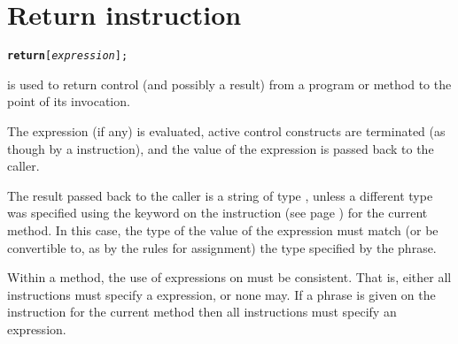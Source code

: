 \section{Return instruction}\label{refreturn}
\begin{shaded}
\begin{alltt}
\textbf{return} [\emph{expression}];
\end{alltt}
\end{shaded}
  is used to return control (and possibly a result)
from a \nr{} program or method to the point of its invocation.
 
The expression (if any) is evaluated, active control constructs are
terminated (as though by a  instruction), and the value of
the expression is passed back to the caller.
 
The result passed back to the caller is a string of type ,
unless a different type was specified using the  keyword
on the   instruction (see page \pageref{refmethod})  for the current
method.
In this case, the type of the value of the expression must match (or be
convertible to, as by the rules for assignment) the type specified by
the  phrase.
 
Within a method, the use of expressions on  must be
consistent.  That is, either all  instructions must
specify a expression, or none may.
If a  phrase is given on the  instruction
for the current method then all  instructions must
specify an expression.
